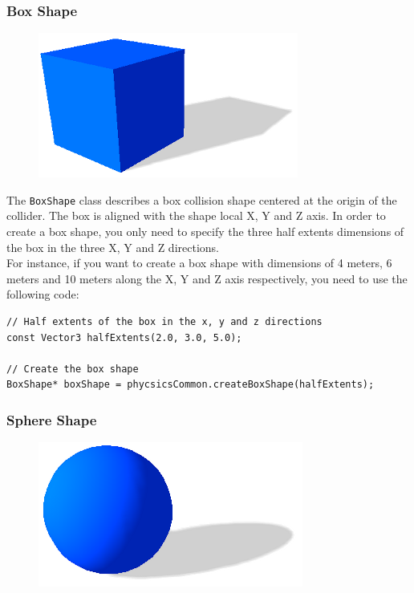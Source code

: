 \documentclass[a4paper,12pt]{article}
\begin{document}
    \subsubsection{Box Shape}

    \begin{figure}[h]
        \centering
        \includegraphics{boxshape.png}
        \label{fig:boxshape}
    \end{figure}

    The \texttt{BoxShape} class describes a box collision shape centered at the origin of the collider. The box is aligned with the shape
    local X, Y and Z axis.  In order to create a box shape, you only need to specify the three half extents dimensions of the box in the three X, Y and
    Z directions. \\

    For instance, if you want to create a box shape with dimensions of 4 meters, 6 meters and 10 meters along the X, Y and Z axis respectively, you
    need to use the following code: \\

    \begin{lstlisting}
// Half extents of the box in the x, y and z directions
const Vector3 halfExtents(2.0, 3.0, 5.0);

// Create the box shape
BoxShape* boxShape = phycsicsCommon.createBoxShape(halfExtents);
  \end{lstlisting}

    \vspace{0.6cm}

    \subsubsection{Sphere Shape}

    \begin{figure}[h]
        \centering
        \includegraphics{sphereshape.png}
        \label{fig:sphereshape}
    \end{figure}
\end{document}
